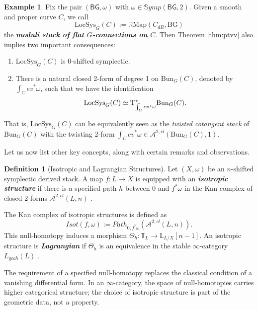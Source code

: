 \documentclass[reqno]{amsart}
\theoremstyle{definition}
\newtheorem{definition}[theorem]{Definition}
\newtheorem{example}[theorem]{Example}
\theoremstyle{remark}
\newcommand{\LL}{\mathbb{L}}
\newcommand{\TT}{\mathbb{T}}
\newcommand{\bfem}[1]{\textbf{\textit{#1}}}
\newcommand{\R}{{\mathbb R}}
\begin{document}
{\begin{example}
    Fix the pair $(\mathsf{B G}, \omega)$ with $\omega \in \mathbb{S}ymp(\mathsf{B G}, 2)$. Given  a smooth and proper curve $C$, we call
    \begin{equation*}
        \mathrm{LocSys}_G(C) := \R\mathrm{Map} (C_{dR},\mathrm{BG})
    \end{equation*}
    the \bfem{moduli stack of flat $ G $-connections on $ C $}. Then Theorem \ref{thm:ptvv} also implies two important consequences:
    \begin{enumerate}
        \item $ \mathrm{LocSys}_G(C)$ is 0-shifted symplectic.
        \item There is a natural closed 2-form of degree 1 on $ \mathrm{Bun}_G(C) $, denoted by $\int_C ev^* \omega$, such that we have the identification \cite[Prop. 1.24]{Safronov2023} \begin{equation*}
        \mathrm{LocSys}_G(C)\simeq {\rm T}_{\int_C ev^* \omega}^*\mathrm{Bun}_G(C).
    \end{equation*}
            \end{enumerate} That is, $ \mathrm{LocSys}_G(C) $ can be equivalently seen as the \textit{twisted cotangent stack} of $ \mathrm{Bun}_G(C)$ with the twisting 2-form $ \int_C ev^* \omega \in \mathcal{A}^{2,cl}(\mathrm{Bun}_G(C), 1).$
\end{example}

Let us now list other key concepts, along with certain remarks and observations.
\begin{definition}[Isotropic and Lagrangian Structures]
  Let $(X, \omega)$ be an $n$-shifted symplectic derived stack. A map
  $f: L \to X$ is equipped with an \bfem{isotropic structure} if
  there is a specified path $h$ between $0$ and $f^*\omega$ in the
  Kan complex of
  closed 2-forms $\mathcal{A}^{2, cl}(L, n)$ \cite[Definition
  2.7]{PTVV}. 
  
  The Kan complex of isotropic structures is
  defined as $$Isot(f, \omega) := Path_{0,
  f^*\omega}(\mathcal{A}^{2,cl}(L, n)).$$ This
  null-homotopy induces a morphism $\Theta_h: \TT_L \to
  \LL_{L/X}[n-1]$. An isotropic structure is
  \bfem{Lagrangian} if $\Theta_h$ is an equivalence in the stable
  $\infty$-category $L_{qcoh}(L)$ \cite[Definition 2.8]{PTVV}.
\end{definition}

The requirement of a specified null-homotopy replaces the classical
condition of a vanishing differential form. In an $\infty$-category,
the space of null-homotopies carries higher categorical
structure; the choice of isotropic structure is part of the geometric
data, not a property.
\vspace{1in}

}
\end{document}
